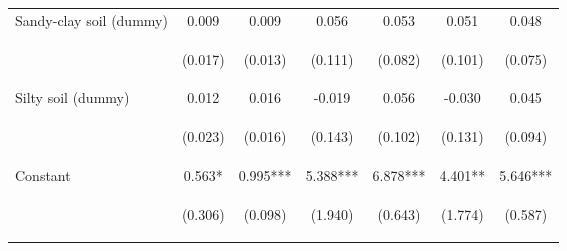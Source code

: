 \begin{center}
\begin{tabular}{lcccccc}
Sandy-clay soil (dummy) & 0.009 & 0.009 & 0.056 & 0.053 & 0.051 & 0.048 \\
\vspace{4pt} & \begin{footnotesize}(0.017)\end{footnotesize} & \begin{footnotesize}(0.013)\end{footnotesize} & \begin{footnotesize}(0.111)\end{footnotesize} & \begin{footnotesize}(0.082)\end{footnotesize} & \begin{footnotesize}(0.101)\end{footnotesize} & \begin{footnotesize}(0.075)\end{footnotesize} \\
Silty soil (dummy) & 0.012 & 0.016 & -0.019 & 0.056 & -0.030 & 0.045 \\
\vspace{4pt} & \begin{footnotesize}(0.023)\end{footnotesize} & \begin{footnotesize}(0.016)\end{footnotesize} & \begin{footnotesize}(0.143)\end{footnotesize} & \begin{footnotesize}(0.102)\end{footnotesize} & \begin{footnotesize}(0.131)\end{footnotesize} & \begin{footnotesize}(0.094)\end{footnotesize} \\
Constant & 0.563* & 0.995*** & 5.388*** & 6.878*** & 4.401** & 5.646*** \\
 & \begin{footnotesize}(0.306)\end{footnotesize} & \begin{footnotesize}(0.098)\end{footnotesize} & \begin{footnotesize}(1.940)\end{footnotesize} & \begin{footnotesize}(0.643)\end{footnotesize} & \begin{footnotesize}(1.774)\end{footnotesize} & \begin{footnotesize}(0.587)\end{footnotesize} \\

\end{tabular}
\end{center}
